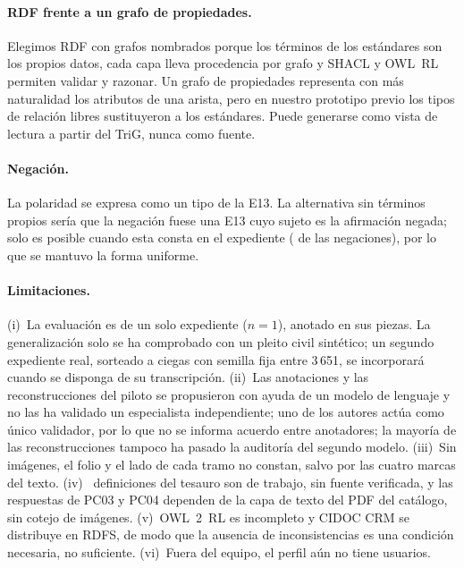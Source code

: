 \documentclass[runningheads]{llncs}
\begin{document}
\paragraph{RDF frente a un grafo de propiedades.}
Elegimos RDF con grafos nombrados porque los términos de los estándares son los propios datos, cada capa lleva
procedencia por grafo y SHACL y OWL~RL permiten validar y razonar. Un grafo de propiedades representa con más
naturalidad los atributos de una arista, pero en nuestro prototipo previo los tipos de relación libres sustituyeron a
los estándares. Puede generarse como vista de lectura a partir del TriG, nunca como fuente.

\paragraph{Negación.}
La polaridad se expresa como un tipo de la E13. La alternativa sin términos propios sería que la negación fuese una
E13 cuyo sujeto es la afirmación negada; solo es posible cuando esta consta en el expediente (\cifraNegacionesConRespuesta{} de las \cifraNegaciones{}
negaciones), por lo que se mantuvo la forma uniforme.

\paragraph{Limitaciones.}
(i)~La evaluación es de un solo expediente ($n=1$), anotado en sus \cifraPiezas{} piezas. La generalización solo se ha
comprobado con un pleito civil sintético; un segundo expediente real, sorteado a ciegas con semilla fija entre 3\,651,
se incorporará cuando se disponga de su transcripción.
(ii)~Las anotaciones y las reconstrucciones del piloto se propusieron con ayuda de un modelo de lenguaje y no las ha
validado un especialista independiente; uno de los autores actúa como único validador, por lo que no se informa
acuerdo entre anotadores; la mayoría de las reconstrucciones tampoco ha pasado la auditoría del segundo modelo.
(iii)~Sin imágenes, el folio y el lado de cada tramo no constan, salvo por las cuatro marcas del texto.
(iv)~\cifraDefinicionesDeTrabajo{} definiciones del tesauro son de trabajo, sin fuente verificada, y las respuestas de PC03 y PC04 dependen
de la capa de texto del PDF del catálogo, sin cotejo de imágenes.
(v)~OWL~2~RL es incompleto y CIDOC CRM se distribuye en RDFS, de modo que la ausencia de inconsistencias es una
condición necesaria, no suficiente.
(vi)~Fuera del equipo, el perfil aún no tiene usuarios.
\end{document}
